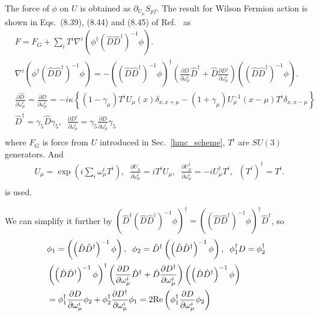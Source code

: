 The force of $\phi$ on $U$ is obtained as $\partial _{U_{\mu}}S_{pf}$. The result for Wilson Fermion action is shown in Eqs.~(8.39), (8.44) and (8.45) of Ref.~\cite{latticeqcdbook2010} as
\begin{equation}
\begin{split}
&F=F_G+\sum _i T^i \nabla ^i \left(\phi ^{\dagger}\left(\hat{D}\hat{D}^{\dagger}\right)^{-1}\phi\right).\\
&\nabla ^i \left(\phi ^{\dagger}\left(\hat{D}\hat{D}^{\dagger}\right)^{-1}\phi\right) = -\left(\left(\hat{D}\hat{D}^{\dagger}\right)^{-1}\phi\right)^{\dagger}\left(\frac{\partial D}{\partial \omega _{\mu}^i}\hat{D}^{\dagger}+\hat{D}\frac{\partial D^{\dagger}}{\partial \omega _{\mu}^i}\right)\left(\left(\hat{D}\hat{D}^{\dagger}\right)^{-1}\phi\right).\\
&\frac{\partial \hat{D}}{\partial {\omega _{\mu}^i}}=\frac{\partial D}{\partial {\omega _{\mu}^i}}=-i\kappa \left\{(1-\gamma _{\mu})T^iU_{\mu}(x)\delta _{x,x+\mu}-(1+\gamma _{\mu})U_{\mu}^{-1}(x-\mu)T^i\delta _{x,x-\mu} \right\} \\
&\hat{D}^{\dagger} = \gamma _5 \hat{D} \gamma _5, \;\;\frac{\partial D^{\dagger}}{\partial \omega _{\mu}^i}=\gamma _5 \frac{\partial D}{\partial \omega _{\mu}^i} \gamma _5\\
\end{split}
\end{equation}
where $F_G$ is force from $U$ introduced in Sec.~\ref{hmc_scheme}, $T^i$ are $SU(3)$ generators. And
\begin{equation}
\begin{split}
&U_{\mu}=\exp (i\sum _i \omega _{\mu}^i T^i),\;\;\frac{\partial U_{\mu}}{\partial \omega_{\mu}^i}=iT^iU_{\mu},\;\;\frac{\partial U^{\dagger}_{\mu}}{\partial \omega_{\mu}^i}=-iU^{\dagger}_{\mu}T^i,\;\;\left(T^i\right)^{\dagger}=T^i.\\
\end{split}
\end{equation}
is used.

We can simplify it further by $\left(\hat{D}^{\dagger}(\hat{D}\hat{D}^{\dagger})^{-1}\phi\right)^{\dagger}=\left((\hat{D}\hat{D}^{\dagger})^{-1}\phi\right)^{\dagger}\hat{D}^{\dagger}$, so
\begin{equation}
\begin{split}
&\phi _1=\left(\left(\hat{D}\hat{D}^{\dagger}\right)^{-1}\phi\right),\;\;
 \phi _2=\hat{D}^{\dagger}\left(\left(\hat{D}\hat{D}^{\dagger}\right)^{-1}\phi\right),\;\;\phi _1^{\dagger}D=\phi _2^{\dagger}\\
&\left(\left(\hat{D}\hat{D}^{\dagger}\right)^{-1}\phi\right)^{\dagger}\left(\frac{\partial D}{\partial \omega _{\mu}^i}\hat{D}^{\dagger}+\hat{D}\frac{\partial D^{\dagger}}{\partial \omega _{\mu}^i}\right)\left(\left(\hat{D}\hat{D}^{\dagger}\right)^{-1}\phi\right)\\
&=\phi _1^{\dagger} \frac{\partial D}{\partial \omega _{\mu}^i} \phi _2+\phi _2^{\dagger} \frac{\partial D^{\dagger}}{\partial \omega _{\mu}^i} \phi _1=2{\rm Re}\left(\phi _1 ^{\dagger} \frac{\partial D}{\partial \omega _{\mu}^i} \phi _2\right)\\
\end{split}
\end{equation}

